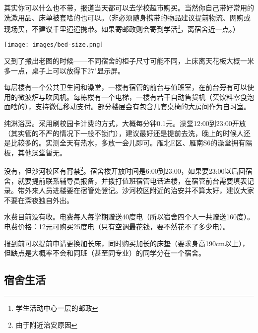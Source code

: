 
其实你可以什么也不带，报道当天都可以去学校超市购买。当然你自己带好常用的洗漱用品、床单被套啥的也可以。（非必须随身携带的物品建议提前物流、网购或现场买，不建议千里迢迢携带。如果寄邮政则会寄到学活\footnote{学生活动中心一层的邮政}，离宿舍近一点。）


\begin{center}
    \texttt{[image: images/bed-size.png]}
\end{center}

又到了搬出老图的时候——不同宿舍的柜子尺寸可能不同，上床离天花板大概一米多一点，桌子上可以放得下27"显示屏。


每层楼有一个公共卫生间和澡堂，一楼有宿管的前台与值班室，在前台旁有可以使用的微波炉与吹风机。每栋楼有一个电梯，一楼有若干自动售货机（买饮料零食泡面啥的），支持微信移动支付。部分楼层会有包含几套桌椅的大房间作为自习室。


纯淋浴房。采用刷校园卡计费的方式，大概每分钟0.1元。澡堂12:00到23:00开放（其实管的不严的情况下一般不锁门），建议最好还是提前去洗，晚上的时候人还是比较多的。实测全天有热水，多放一会儿即可。雁北E区、雁南S6的澡堂拥有隔板，其他澡堂暂无。


没有，但沙河校区有宵禁\footnote{由于附近治安原因}。宿舍楼开放时间是6:00到23:00，如果要23:00以后回宿舍，就要提前联系辅导员报备，并拨打值班宿管电话进楼，在宿管前台需要填表记录。带外来人员进楼要在宿管处登记。沙河校区附近的治安并不算太好，建议大家不要在深夜独自外出。


水费目前没有收。电费每人每学期赠送40度电（所以宿舍四个人一共赠送160度）。电费价格：12元可购买25度电（只有空调最花钱，要不然花不了多少电）。


报到前可以提前申请更换加长床，同时购买加长的床垫（要求身高190cm以上），但缺点是大概率不会和同班（甚至同专业）的同学分在一个宿舍。

\subsection{宿舍生活}


